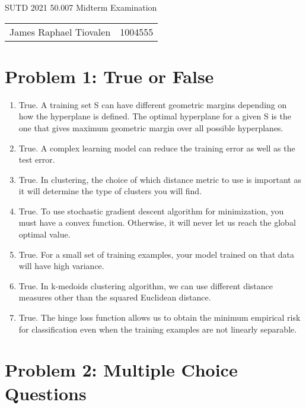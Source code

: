\documentclass[11pt,fancychapters]{article}
\begin{document}
\centerline{\huge{SUTD 2021 50.007 Midterm Examination}}

\begin{table}[ht]
\centering
\footnotesize
 \begin{tabular}{c c} 
James Raphael Tiovalen & 1004555
 \end{tabular}
\end{table}

\section*{Problem 1: True or False}

\begin{enumerate}[label=\textbf{\arabic*.}]
	\item True. A training set S can have different geometric margins depending on how the hyperplane is defined. The optimal hyperplane for a given S is the one that gives maximum geometric margin over all possible hyperplanes.
	\item True. A complex learning model can reduce the training error as well as the test error.
	\item True. In clustering, the choice of which distance metric to use is important as it will determine the type of clusters you will find.
	\item True. To use stochastic gradient descent algorithm for minimization, you must have a convex function. Otherwise, it will never let us reach the global optimal value.
	\item True. For a small set of training examples, your model trained on that data will have high variance.
	\item True. In k-medoids clustering algorithm, we can use different distance measures other than the squared Euclidean distance.
	\item True. The hinge loss function allows us to obtain the minimum empirical risk for classification even when the training examples are not linearly separable.
\end{enumerate}

\section*{Problem 2: Multiple Choice Questions}
\end{document}
